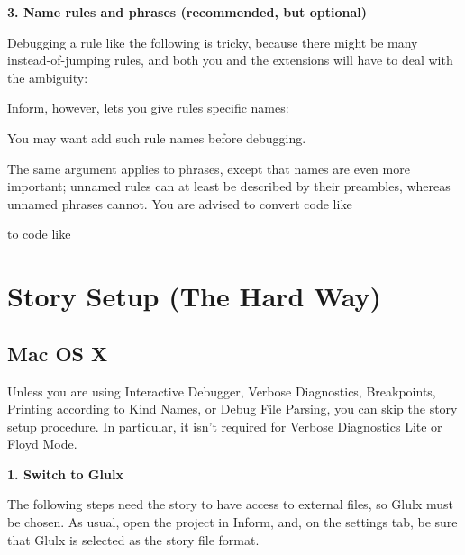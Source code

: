 \documentclass{book}
\newcommand{\lastpagebreak}{\vfill\pagebreak}
\begin{document}
\textbf{3. Name rules and phrases (recommended, but optional)}

Debugging a rule like the following is tricky, because there might be many
instead-of-jumping rules, and both you and the extensions will have to deal with
the ambiguity:

\begin{quote}
  
\end{quote}

Inform, however, lets you give rules specific names:

\begin{quote}
  
\end{quote}

You may want add such rule names before debugging.

The same argument applies to phrases, except that names are even more important;
unnamed rules can at least be described by their preambles, whereas unnamed
phrases cannot.  You are advised to convert code like

\begin{quote}
  
\end{quote}

to code like

\begin{quote}
  
\end{quote}

\lastpagebreak

\section{Story Setup (The Hard Way)}
\label{including-hard}

\subsection{Mac OS X}

Unless you are using Interactive Debugger, Verbose Diagnostics, Breakpoints,
Printing according to Kind Names, or Debug File Parsing, you can skip the story
setup procedure.  In particular, it isn't required for Verbose Diagnostics Lite
or Floyd Mode.

\textbf{1. Switch to Glulx}

The following steps need the story to have access to external files, so Glulx
must be chosen.  As usual, open the project in Inform, and, on the settings tab,
be sure that Glulx is selected as the story file format.
\end{document}
